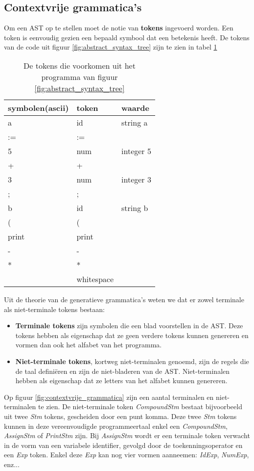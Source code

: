 \subsection{Contextvrije grammatica's}
Om een AST op te stellen moet de notie van \textbf{tokens} ingevoerd worden. Een token is eenvoudig gezien een bepaald symbool dat een betekenis heeft. De tokens van de code uit figuur \ref{fig:abstract_syntax_tree} zijn te zien in tabel \ref{table:tokens}
\begin{table}[h]
	\centering
	\begin{tabular}{l | l | l}
		symbolen(ascii) & token & waarde \\
		\hline
		a & id & string a \\
		:= & := & \\
		5 & num & integer 5 \\
		+ & + & \\
		3 & num & integer 3 \\
		; & ; & \\
		b & id & string b \\
		( & ( & \\
		print & print & \\
		- & - & \\
		* & * & \\
		  & whitespace & \\
	\end{tabular}
	\caption{De tokens die voorkomen uit het programma van figuur \ref{fig:abstract_syntax_tree}}
	\label{table:tokens}
\end{table}
Uit de theorie van de generatieve grammatica's weten we dat er zowel terminale als niet-terminale tokens bestaan:
\begin{itemize}
	\item \textbf{Terminale tokens} zijn symbolen die een blad voorstellen in de AST. Deze tokens hebben als eigenschap dat ze geen verdere tokens kunnen genereren en vormen dan ook het alfabet van het programma.
	\item \textbf{Niet-terminale tokens}, kortweg niet-terminalen genoemd, zijn de regels die de taal definiëren en zijn de niet-bladeren van de AST. Niet-terminalen hebben als eigenschap dat ze letters van het alfabet kunnen genereren.
\end{itemize}
Op figuur \ref{fig:contextvrije_grammatica} zijn een aantal terminalen en niet-terminalen te zien. De niet-terminale token \textit{CompoundStm} bestaat bijvoorbeeld uit twee \textit{Stm} tokens, gescheiden door een punt komma. Deze twee \textit{Stm} tokens kunnen in deze vereenvoudigde programmeertaal enkel een \textit{CompoundStm}, \textit{AssignStm} of \textit{PrintStm} zijn. Bij \textit{AssignStm} wordt er een terminale token verwacht in de vorm van een variabele identifier, gevolgd door de toekenningsoperator en een \textit{Exp} token. Enkel deze \textit{Exp} kan nog vier vormen aanneemen: \textit{IdExp}, \textit{NumExp}, enz...

